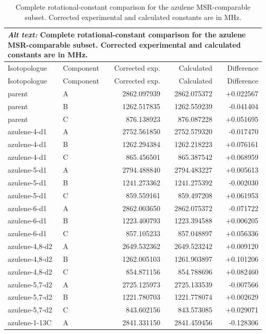\documentclass[12pt]{article}
\begin{document}
\begin{longtable}{llrrr}
\caption{Complete rotational-constant comparison for the azulene MSR-comparable subset. Corrected experimental and calculated constants are in MHz.}\label{tab:si-azulene-rotconstants}\\
\multicolumn{5}{p{0.98\linewidth}}{\textit{Alt text:} Complete rotational-constant comparison for the azulene MSR-comparable subset. Corrected experimental and calculated constants are in MHz.}\\
\toprule
Isotopologue & Component & Corrected exp. & Calculated & Difference \\
\midrule
\endfirsthead
\toprule
Isotopologue & Component & Corrected exp. & Calculated & Difference \\
\midrule
\endhead
parent & A & 2862.097939 & 2862.075372 & +0.022567 \\
parent & B & 1262.517835 & 1262.559239 & -0.041404 \\
parent & C & 876.138923 & 876.087228 & +0.051695 \\
azulene-4-d1 & A & 2752.561850 & 2752.579320 & -0.017470 \\
azulene-4-d1 & B & 1262.294384 & 1262.218223 & +0.076161 \\
azulene-4-d1 & C & 865.456501 & 865.387542 & +0.068959 \\
azulene-5-d1 & A & 2794.488840 & 2794.483227 & +0.005613 \\
azulene-5-d1 & B & 1241.273362 & 1241.275392 & -0.002030 \\
azulene-5-d1 & C & 859.559161 & 859.497208 & +0.061953 \\
azulene-6-d1 & A & 2862.003650 & 2862.075372 & -0.071722 \\
azulene-6-d1 & B & 1223.400793 & 1223.394588 & +0.006205 \\
azulene-6-d1 & C & 857.105233 & 857.048897 & +0.056336 \\
azulene-4,8-d2 & A & 2649.532362 & 2649.523242 & +0.009120 \\
azulene-4,8-d2 & B & 1262.005103 & 1261.903897 & +0.101206 \\
azulene-4,8-d2 & C & 854.871156 & 854.788696 & +0.082460 \\
azulene-5,7-d2 & A & 2725.125973 & 2725.133539 & -0.007566 \\
azulene-5,7-d2 & B & 1221.780703 & 1221.778074 & +0.002629 \\
azulene-5,7-d2 & C & 843.602156 & 843.573085 & +0.029071 \\
azulene-1-13C & A & 2841.331150 & 2841.459456 & -0.128306 \\

\end{longtable}
\end{document}
